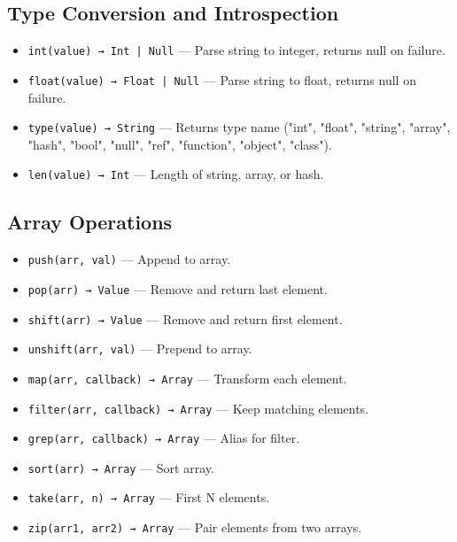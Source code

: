 \subsection{Type Conversion and Introspection}
\begin{itemize}
    \item \texttt{int(value) → Int | Null} — Parse string to integer, returns null on failure.
    \item \texttt{float(value) → Float | Null} — Parse string to float, returns null on failure.
    \item \texttt{type(value) → String} — Returns type name ("int", "float", "string", "array", "hash", "bool", "null", "ref", "function", "object", "class").
    \item \texttt{len(value) → Int} — Length of string, array, or hash.
\end{itemize}

\subsection{Array Operations}
\begin{itemize}
    \item \texttt{push(arr, val)} — Append to array.
    \item \texttt{pop(arr) → Value} — Remove and return last element.
    \item \texttt{shift(arr) → Value} — Remove and return first element.
    \item \texttt{unshift(arr, val)} — Prepend to array.
    \item \texttt{map(arr, callback) → Array} — Transform each element.
    \item \texttt{filter(arr, callback) → Array} — Keep matching elements.
    \item \texttt{grep(arr, callback) → Array} — Alias for filter.
    \item \texttt{sort(arr) → Array} — Sort array.
    \item \texttt{take(arr, n) → Array} — First N elements.
    \item \texttt{zip(arr1, arr2) → Array} — Pair elements from two arrays.
\end{itemize}

